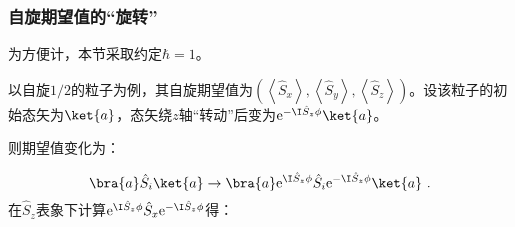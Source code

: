 \subsubsection{自旋期望值的“旋转”}
为方便计，本节采取约定$\hbar=1$。

以自旋$1/2$的粒子为例，其自旋期望值为$(\left\langle \hat S_{x}\right\rangle,\left\langle \hat S_{y}\right\rangle,\left\langle \hat S_{z}\right\rangle)$。设该粒子的初始态矢为$\ket{a}$，态矢绕$z$轴“转动”后变为$\mathrm e^{- \I\hat S_z\phi}\ket{a}$。

则期望值变化为：

\begin{equation}
\bra{a}\hat S_i\ket{a}\rightarrow \bra{a}\mathrm e^{ \I\hat S_z\phi}\hat S_i\mathrm e^{- \I\hat S_z\phi}\ket{a}~.
\end{equation}
在$\hat S_z$表象下计算$\mathrm e^{ \I\hat S_z\phi}\hat S_x\mathrm e^{- \I\hat S_z\phi }$得：

